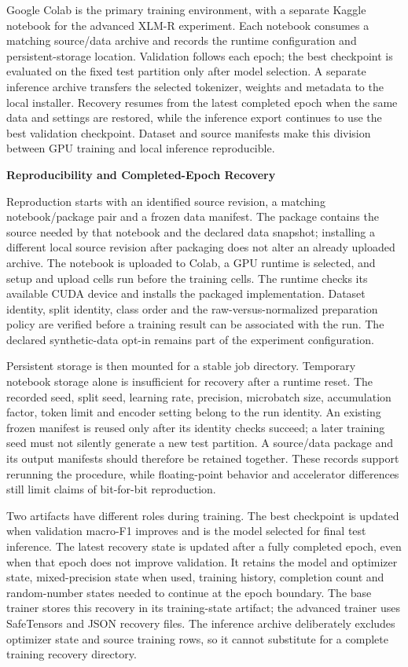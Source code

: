 \documentclass[journal]{IEEEtran}
\begin{document}
Google Colab is the primary training environment, with a separate Kaggle notebook for the advanced XLM-R experiment. Each notebook consumes a matching source/data archive and records the runtime configuration and persistent-storage location. Validation follows each epoch; the best checkpoint is evaluated on the fixed test partition only after model selection. A separate inference archive transfers the selected tokenizer, weights and metadata to the local installer. Recovery resumes from the latest completed epoch when the same data and settings are restored, while the inference export continues to use the best validation checkpoint. Dataset and source manifests make this division between GPU training and local inference reproducible.

\textbf{Reproducibility and Completed-Epoch Recovery}

Reproduction starts with an identified source revision, a matching notebook/package pair and a frozen data manifest. The package contains the source needed by that notebook and the declared data snapshot; installing a different local source revision after packaging does not alter an already uploaded archive. The notebook is uploaded to Colab, a GPU runtime is selected, and setup and upload cells run before the training cells. The runtime checks its available CUDA device and installs the packaged implementation. Dataset identity, split identity, class order and the raw-versus-normalized preparation policy are verified before a training result can be associated with the run. The declared synthetic-data opt-in remains part of the experiment configuration.

Persistent storage is then mounted for a stable job directory. Temporary notebook storage alone is insufficient for recovery after a runtime reset. The recorded seed, split seed, learning rate, precision, microbatch size, accumulation factor, token limit and encoder setting belong to the run identity. An existing frozen manifest is reused only after its identity checks succeed; a later training seed must not silently generate a new test partition. A source/data package and its output manifests should therefore be retained together. These records support rerunning the procedure, while floating-point behavior and accelerator differences still limit claims of bit-for-bit reproduction.

Two artifacts have different roles during training. The best checkpoint is updated when validation macro-F1 improves and is the model selected for final test inference. The latest recovery state is updated after a fully completed epoch, even when that epoch does not improve validation. It retains the model and optimizer state, mixed-precision state when used, training history, completion count and random-number states needed to continue at the epoch boundary. The base trainer stores this recovery in its training-state artifact; the advanced trainer uses SafeTensors and JSON recovery files. The inference archive deliberately excludes optimizer state and source training rows, so it cannot substitute for a complete training recovery directory.
\end{document}

